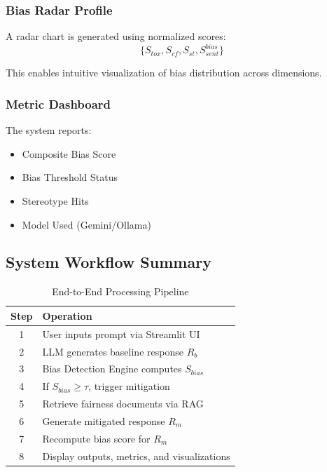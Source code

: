 \documentclass[conference]{IEEEtran}
\begin{document}
\vspace{4pt}

\subsubsection{Bias Radar Profile}

A radar chart is generated using normalized scores:
\begin{equation}
\{S_{tox}, S_{cf}, S_{st}, S_{sent}^{bias}\}
\end{equation}

This enables intuitive visualization of bias distribution across dimensions.

\vspace{4pt}

\subsubsection{Metric Dashboard}

The system reports:
\begin{itemize}
    \item Composite Bias Score
    \item Bias Threshold Status
    \item Stereotype Hits
    \item Model Used (Gemini/Ollama)
\end{itemize}

\vspace{6pt}

\subsection{System Workflow Summary}

\begin{table}[h]
\caption{End-to-End Processing Pipeline}
\label{tab:pipeline}
\centering
\begin{tabular}{c p{6cm}}
\toprule
\textbf{Step} & \textbf{Operation} \\
\midrule
1 & User inputs prompt via Streamlit UI \\
2 & LLM generates baseline response $R_b$ \\
3 & Bias Detection Engine computes $S_{bias}$ \\
4 & If $S_{bias} \geq \tau$, trigger mitigation \\
5 & Retrieve fairness documents via RAG \\
6 & Generate mitigated response $R_m$ \\
7 & Recompute bias score for $R_m$ \\
8 & Display outputs, metrics, and visualizations \\
\bottomrule
\end{tabular}
\end{table}
\end{document}
